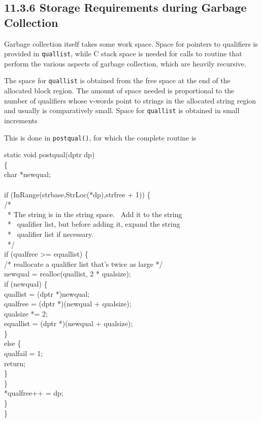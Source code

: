 \subsection[11.3.6 Storage Requirements during Garbage Collection]{11.3.6 Storage Requirements during Garbage Collection}

Garbage collection itself takes some work space. Space for pointers to
qualifiers is provided in \texttt{quallist}, while C stack space is
needed for calls to routine that perform the various aspects of
garbage collection, which are heavily recursive.

The space for \texttt{quallist} is obtained from the free space at the
end of the allocated block region. The amount of space needed is
proportional to the number of qualifiers whose v-words point to
strings in the allocated string region and usually is comparatively
small. Space for \texttt{quallist} is obtained in small increments

This is done in \texttt{postqual()}, for which the complete routine is

\begin{iconcode}
static void postqual(dptr dp)\\
\>\{\\
\>char *newqual;\\
\\
\>if (InRange(strbase,StrLoc(*dp),strfree + 1)) \{\\
\>\>/*\\
\>\>\ * The string is in the string space. \ Add it to the string\\
\>\>\ * \ qualifier list, but before adding it, expand the string\\
\>\>\ * \ qualifier list if necessary.\\
\>\>\ */\\
\>\>if (qualfree >= equallist) \{\\
\>\>\>/* reallocate a qualifier list that's twice as large */\\
\>\>\>newqual = realloc(quallist, 2 * qualsize);\\
\>\>\>if (newqual) \{\\
\>\>\>\>quallist = (dptr *)newqual;\\
\>\>\>\>qualfree = (dptr *)(newqual + qualsize);\\
\>\>\>\>qualsize *= 2;\\
\>\>\>\>equallist = (dptr *)(newqual + qualsize);\\
\>\>\>\>\}\\
\>\>\>else \{\\
\>\>\>\>qualfail = 1;\\
\>\>\>\>return;\\
\>\>\>\>\}\\
\>\>\>\}\\
\>\>*qualfree++ = dp;\\
\>\>\}\\
\>\}
\end{iconcode}

